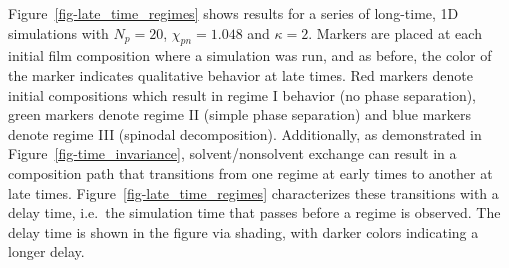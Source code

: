 \documentclass[journal=mamobx, layout=twocolumn]{achemso}
\begin{document}
Figure~\ref{fig-late_time_regimes} shows results for a series of long-time, 1D simulations with $N_{p} = 20$, $\chi_{pn} = 1.048$ and $\kappa = 2$.
Markers are placed at each initial film composition where a simulation was run, and as before, the color of the marker indicates qualitative behavior at late times.
Red markers denote initial compositions which result in regime I behavior (no phase separation), green markers denote regime II (simple phase separation) and blue markers denote regime III (spinodal decomposition).
Additionally, as demonstrated in Figure~\ref{fig-time_invariance}, solvent/nonsolvent exchange can result in a composition path that transitions from one regime at early times to another at late times.
Figure~\ref{fig-late_time_regimes} characterizes these transitions with a delay time, i.e.\ the simulation time that passes before a regime is observed.
The delay time is shown in the figure via shading, with darker colors indicating a longer delay.
\end{document}
